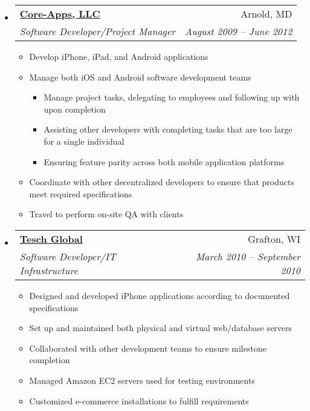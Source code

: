 \documentclass[letterpaper,12pt]{article}
\makeatletter
\newcommand{\resitem}[1]{\item #1 \vspace{-2pt}}
\newcommand{\ressubheading}[4]{
\begin{tabular*}{6.5in}{l@{\extracolsep{\fill}}r}
		\textbf{#1} & #2 \\
		\textit{#3} & \textit{#4} \\
\end{tabular*}\vspace{-6pt}}
\makeatother
\begin{document}
\begin{itemize}
     \item 
			\ressubheading{\href{http://www.core-apps.com/Home.html}{Core-Apps, LLC}}{Arnold, MD}{Software Developer/Project Manager}{August 2009 -- June 2012}
				{ \footnotesize
				\begin{itemize}
					\resitem{Develop iPhone, iPad, and Android applications}
					\resitem{Manage both iOS and Android software development teams}
						\begin{itemize}
							\resitem{Manage project tasks, delegating to employees and following  up with upon completion}
							\resitem{Assisting other developers with completing tasks that are too large for a single individual}
							\resitem{Ensuring feature parity across both mobile application platforms}
						\end{itemize}
					\resitem{Coordinate with other decentralized developers to ensure that products meet required specifications}
					\resitem{Travel to perform on-site QA with clients}
				\end{itemize}
         }
     \item 
			\ressubheading{\href{http://www.teschglobal.com/}{Tesch Global}}{Grafton, WI}{Software Developer/IT Infrastructure}{March 2010 -- September 2010}
				{ \footnotesize
				\begin{itemize}
					\resitem{Designed and developed iPhone applications according to documented specifications}
					\resitem{Set up and maintained both physical and virtual web/database servers}
					\resitem{Collaborated with other development teams to ensure milestone completion}
					\resitem{Managed Amazon EC2 servers used for testing environments}
					\resitem{Customized e-commerce installations to fulfill requirements}
				\end{itemize}
         }


\end{itemize}
\end{document}
